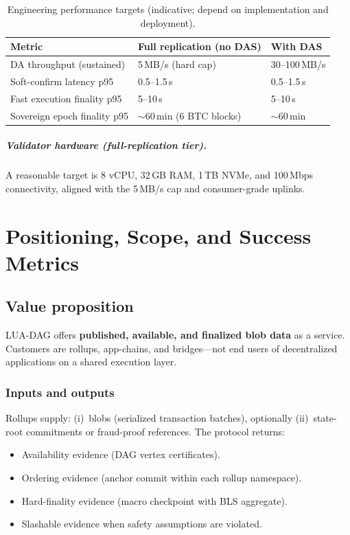 \documentclass[11pt,a4paper,twoside]{report}
\theoremstyle{definition}
\begin{document}
\begin{table}[htbp]
  \centering
  \caption{Engineering performance targets (indicative; depend on implementation and deployment).}
  \label{tab:perf-targets}
  \begin{tabular}{@{}lll@{}}
    \toprule
    \textbf{Metric} & \textbf{Full replication (no DAS)} & \textbf{With DAS} \\
    \midrule
    DA throughput (sustained) & 5\,MB/s (hard cap) & 30--100\,MB/s \\
    Soft-confirm latency p95 & 0.5--1.5\,s & 0.5--1.5\,s \\
    Fast execution finality p95 & 5--10\,s & 5--10\,s \\
    Sovereign epoch finality p95 & $\sim$60\,min (6 BTC blocks) & $\sim$60\,min \\
    \bottomrule
  \end{tabular}
\end{table}

\paragraph{Validator hardware (full-replication tier).} A reasonable target is 8 vCPU, 32\,GB RAM, 1\,TB NVMe, and 100\,Mbps connectivity, aligned with the 5\,MB/s cap and consumer-grade uplinks.

\chapter{Positioning, Scope, and Success Metrics}
\label{ch:positioning}

\section{Value proposition}
LUA-DAG offers \textbf{published, available, and finalized blob data} as a service. Customers are rollups, app-chains, and bridges---not end users of decentralized applications on a shared execution layer.

\subsection{Inputs and outputs}
Rollups supply: (i)~blobs (serialized transaction batches), optionally (ii)~state-root commitments or fraud-proof references. The protocol returns:
\begin{itemize}[leftmargin=*]
  \item Availability evidence (DAG vertex certificates).
  \item Ordering evidence (anchor commit within each rollup namespace).
  \item Hard-finality evidence (macro checkpoint with BLS aggregate).
  \item Slashable evidence when safety assumptions are violated.
\end{itemize}
\end{document}
